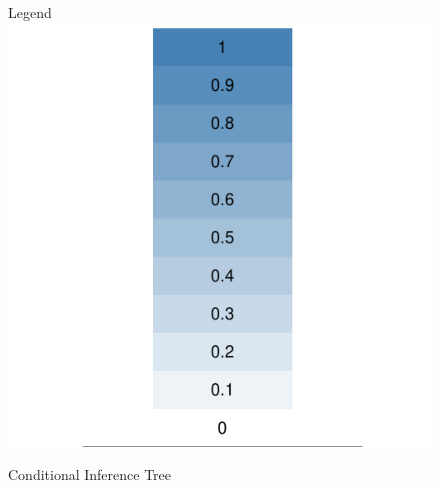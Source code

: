\begin{figure}
\begin{center}
\begin{minipage}{0.20\textwidth}
  \end{minipage}
  \hspace{0.05\textwidth}
  \begin{minipage}{0.20\textwidth}
    \hspace{1.0in}
  \end{minipage}
  \hspace{0.05\textwidth}
  \begin{minipage}{0.20\textwidth}
    \begin{center}
      \hspace{0.11in} Legend\\
      \hspace{-0.1in} \includegraphics[scale=0.20]{../graphics/scale.pdf}  
    \end{center}
  \end{minipage}




    Conditional Inference Tree \\


\end{center}
\end{figure}

